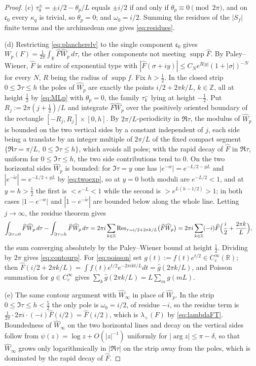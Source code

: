 \documentclass[11pt]{amsart}
\theoremstyle{definition}
\theoremstyle{remark}
\newcommand{\R}{\mathbb R}
\newcommand{\Z}{\mathbb Z}
\newcommand{\supp}{\operatorname{supp}}
\newcommand{\Res}{\operatorname{Res}}
\newcommand{\Wh}{\widehat{W}}
\begin{document}
\begin{proof}
(c)  $\tau_0^{\pm}=\pm i/2-\theta_p/L$ equals $\pm i/2$ if and only if
$\theta_p\equiv0\pmod{2\pi}$, and on $\mathfrak c_0$ every $\kappa_q$ is
trivial, so $\theta_p=0$; and $\omega_0=i/2$.  Summing the residues of the
$|S_f|$ finite terms and the archimedean one gives \eqref{eq:residues}.

(d)  Restricting \eqref{eq:plancherelv} to the single component $\mathfrak c_0$
gives $W_p(F)=\tfrac1{2\pi}\int_{\R}\widehat F\Wh_p\,d\tau$, the other
components not meeting $\supp\widehat F$.  By Paley--Wiener, $\widehat F$ is
entire of exponential type with $|\widehat F(\sigma+iy)|\le
C_Ne^{R|y|}(1+|\sigma|)^{-N}$ for every $N$, $R$ being the radius of $\supp f$.
Fix $h>\tfrac12$.  In the closed strip $0\le\Im\tau\le h$ the poles of
$\Wh_p$ are exactly the points $i/2+2\pi k/L$, $k\in\Z$, all at height
$\tfrac12$ by \eqref{eq:MLp} with $\theta_p=0$, the family $\tau_k^{-}$ lying
at height $-\tfrac12$.  Put $R_j:=2\pi(j+\tfrac12)/L$ and integrate
$\widehat F\Wh_p$ over the positively oriented boundary of the rectangle
$[-R_j,R_j]\times[0,h]$.  By $2\pi/L$-periodicity in $\Re\tau$, the modulus of
$\Wh_p$ is bounded on the two vertical sides by a constant independent of $j$,
each side being a translate by an integer multiple of $2\pi/L$ of the fixed
compact segment $\{\Re\tau=\pi/L,\ 0\le\Im\tau\le h\}$, which avoids all poles;
with the rapid decay of $\widehat F$ in $\Re\tau$, uniform for
$0\le\Im\tau\le h$, the two side contributions tend to $0$.  On the two
horizontal sides $\Wh_p$ is bounded: for $\Im\tau=y$ one has
$|e^{-w}|=e^{-L/2-yL}$ and $|e^{-\tilde w}|=e^{-L/2+yL}$ by \eqref{eq:twoexp},
so at $y=0$ both moduli are $e^{-L/2}<1$, and at $y=h>\tfrac12$ the first is
$<e^{-L}<1$ while the second is $>e^{L(h-1/2)}>1$; in both cases $|1-e^{-w}|$
and $|1-e^{-\tilde w}|$ are bounded below along the whole line.  Letting
$j\to\infty$, the residue theorem gives
\[
\int_{\Im\tau=0}\widehat F\Wh_p\,d\tau-\int_{\Im\tau=h}\widehat F\Wh_p\,d\tau
=2\pi i\sum_{k\in\Z}\Res_{\tau=i/2+2\pi k/L}\bigl(\widehat F\Wh_p\bigr)
=2\pi i\sum_{k\in\Z}(-i)\widehat F\Bigl(\frac i2+\frac{2\pi k}{L}\Bigr),
\]
the sum converging absolutely by the Paley--Wiener bound at height $\tfrac12$.
Dividing by $2\pi$ gives \eqref{eq:contourp}.  For \eqref{eq:poisson} set
$g(t):=f(t)e^{t/2}\in C_c^{\infty}(\R)$; then
$\widehat F(i/2+2\pi k/L)=\int f(t)e^{t/2}e^{-2\pi ikt/L}dt=\widehat g(2\pi k/L)$,
and Poisson summation for $g\in C_c^{\infty}$ gives
$\sum_k\widehat g(2\pi k/L)=L\sum_mg(mL)$.

(e)  The same contour argument with $\Wh_{\infty}$ in place of $\Wh_p$.  In the
strip $0\le\Im\tau\le h<\tfrac52$ the only pole is $\omega_0=i/2$, of residue
$-i$, so the residue term is $\tfrac1{2\pi}\cdot2\pi i\cdot(-i)\widehat
F(i/2)=\widehat F(i/2)$, which is $\lambda_+(F)$ by \eqref{eq:lambdaFT}.
Boundedness of $\Wh_{\infty}$ on the two horizontal lines and decay on the
vertical sides follow from $\psi(z)=\log z+O(|z|^{-1})$ uniformly for
$|\arg z|\le\pi-\delta$, so that $\Wh_{\infty}$ grows only logarithmically in
$|\Re\tau|$ on the strip away from the poles, which is dominated by the rapid
decay of $\widehat F$.
\end{proof}
\end{document}

